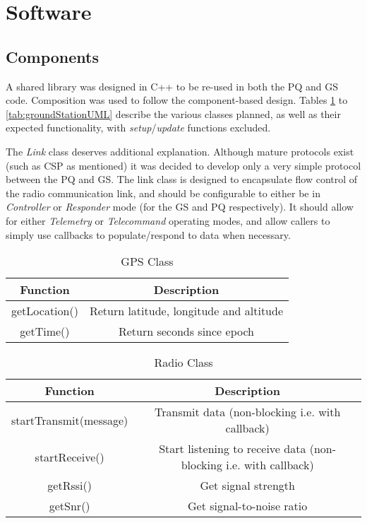 \graphicspath{{./figures}}

\section{Software}

\subsection{Components}

A shared library was designed in C++ to be re-used in both the PQ and GS code. Composition was used to follow the component-based design. Tables \ref{tab:gpsUML} to \ref{tab:groundStationUML} describe the various classes planned, as well as their expected functionality, with \textit{setup}/\textit{update} functions excluded.

The \textit{Link} class deserves additional explanation. Although mature protocols exist (such as CSP as mentioned) it was decided to develop only a very simple protocol between the PQ and GS. The link class is designed to encapsulate flow control of the radio communication link, and should be configurable to either be in \textit{Controller} or \textit{Responder} mode (for the GS and PQ respectively). It should allow for either \textit{Telemetry} or \textit{Telecommand} operating modes, and allow callers to simply use callbacks to populate/respond to data when necessary.

\begin{table}[!htb]
  \centering
  \caption{GPS Class}
  \renewcommand{\arraystretch}{1.2}
  \begin{tabular}{ |c|c| }
  \hline
  \textbf{Function}        & \textbf{Description}    \\
  \hline
    getLocation()              & Return latitude, longitude and altitude \\
    getTime()                  & Return seconds since epoch \\
  \hline
  \end{tabular}
  \label{tab:gpsUML}
\end{table}

\begin{table}[!htb]
  \centering
  \caption{Radio Class}
  \renewcommand{\arraystretch}{1.2}
  \begin{tabular}{ |c|c| }
  \hline
  \textbf{Function}        & \textbf{Description}    \\
  \hline
    startTransmit(message)              & Transmit data (non-blocking i.e. with callback) \\
    startReceive()                      & Start listening to receive data (non-blocking i.e. with callback) \\
    getRssi()                           & Get signal strength \\
    getSnr()                            & Get signal-to-noise ratio \\
  \hline
  \end{tabular}
  \label{tab:radioUML}
\end{table}

